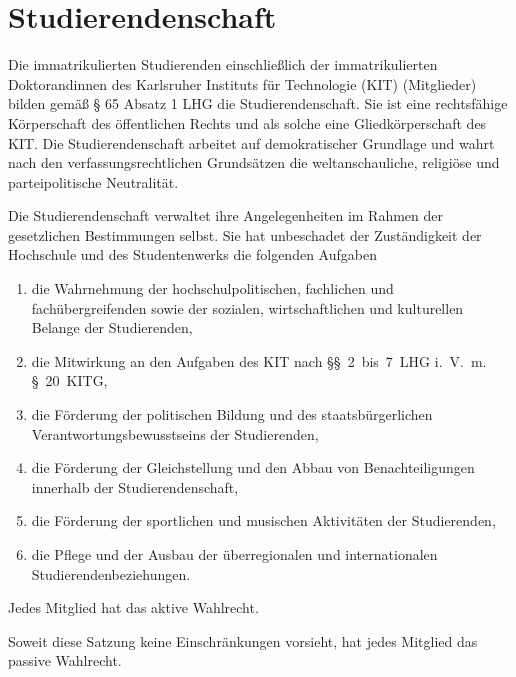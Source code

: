 

%
%

\parnumberfalse \section{Studierendenschaft} \parnumbertrue

\parnumberfalse Die immatrikulierten Studierenden einschließlich der immatrikulierten Doktorandinnen des Karlsruher Instituts für Technologie (KIT) (Mitglieder) bilden gemäß § 65 Absatz 1 LHG die Studierendenschaft. Sie ist eine rechtsfähige Körperschaft des öffentlichen Rechts und als solche eine Gliedkörperschaft des KIT. Die Studierendenschaft arbeitet auf demokratischer Grundlage und wahrt nach den verfassungsrechtlichen Grundsätzen die weltanschauliche, religiöse und parteipolitische Neutralität.\parnumbertrue

\label{studierendenschaft:aufgaben}

\parnumberfalse Die Studierendenschaft verwaltet ihre Angelegenheiten im Rahmen der gesetzlichen Bestimmungen selbst. Sie hat unbeschadet der Zuständigkeit der Hochschule und des Studentenwerks die folgenden Aufgaben
\begin{enumerate}
\item die Wahrnehmung der hochschulpolitischen, fachlichen und fachübergreifenden sowie der sozialen, wirtschaftlichen und kulturellen Belange der Studierenden,
\item die Mitwirkung an den Aufgaben des KIT nach §§~2~bis~7~LHG i.~V.~m. §~20~KITG,
\item die Förderung der politischen Bildung und des staatsbürgerlichen Verantwortungsbewusstseins der Studierenden,
\item die Förderung der Gleichstellung und den Abbau von Benachteiligungen innerhalb der Studierendenschaft,
\item die Förderung der sportlichen und musischen Aktivitäten der Studierenden,
\item die Pflege und der Ausbau der überregionalen und internationalen Studierendenbeziehungen.
\end{enumerate}\parnumbertrue

\label{studierendenschaft:mitglieder}

Jedes Mitglied hat das aktive Wahlrecht.

Soweit diese Satzung keine Einschränkungen vorsieht, hat jedes Mitglied das passive Wahlrecht.

